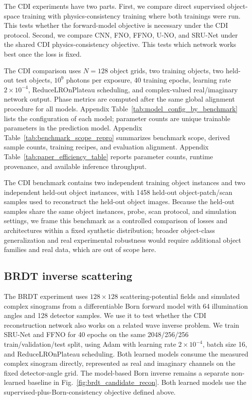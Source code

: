 \documentclass[11pt]{article}
\begin{document}
The CDI experiments have two parts. First, we compare direct supervised
object-space training with physics-consistency training where both trainings were
run. This tests whether the forward-model objective is necessary under
the CDI protocol. Second, we compare CNN, FNO, FFNO,
U-NO, and SRU-Net under the shared CDI physics-consistency objective. This tests which network works best once the loss is fixed.

The CDI comparison uses $N=128$ object grids, two training objects, two
held-out test objects, $10^9$ photons per exposure, 40 training epochs,
learning rate $2\times 10^{-4}$, ReduceLROnPlateau scheduling,
and complex-valued real/imaginary network output. Phase metrics are computed
after the same global alignment procedure for all models. Appendix
Table~\ref{tab:model_config_by_benchmark} lists the configuration of
each model; parameter counts are unique trainable parameters in the prediction
model. Appendix Table~\ref{tab:benchmark_scope_repro} summarizes benchmark
scope, derived sample counts, training recipes, and evaluation alignment.
Appendix Table~\ref{tab:paper_efficiency_table} reports parameter counts,
runtime provenance, and available inference throughput.

The CDI benchmark contains two independent training object instances and two
independent held-out object instances, with 1458 held-out object-patch/scan
samples used to reconstruct the held-out object images. Because the held-out
samples share the same object instances, probe, scan protocol, and simulation
settings, we frame this benchmark as a controlled comparison of losses and
architectures within a fixed synthetic distribution; broader object-class
generalization and real experimental robustness would require additional
object families and real data, which are out of scope here.

\subsection{BRDT inverse scattering}

The BRDT experiment uses
$128\times128$ scattering-potential fields and simulated complex sinograms from
a differentiable Born forward model with 64 illumination angles and 128
detector samples. We use it to test whether the CDI reconstruction network also
works on a related wave inverse problem. We train SRU-Net and FFNO for 40
epochs on the same
2048/256/256 train/validation/test split, using Adam \cite{adam} with learning
rate $2\times10^{-4}$, batch size 16, and ReduceLROnPlateau scheduling.
Both learned models consume the measured complex sinogram directly, represented
as real and imaginary channels on the fixed detector-angle grid. The
model-based Born inverse remains a separate non-learned baseline in
Fig.~\ref{fig:brdt_candidate_recon}. Both learned models use the
supervised-plus-Born-consistency objective defined above.
\end{document}

